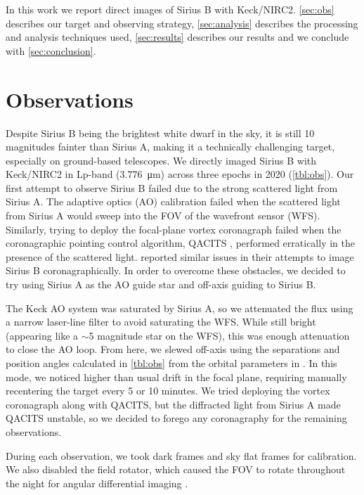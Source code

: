 \documentclass[twocolumn]{aastex631}
\begin{document}
In this work we report direct images of Sirius B with Keck/NIRC2. \autoref{sec:obs} describes our target and observing strategy, \autoref{sec:analysis} describes the processing and analysis techniques used, \autoref{sec:results} describes our results and we conclude with \autoref{sec:conclusion}.

\section{Observations} \label{sec:obs}

Despite Sirius B being the brightest white dwarf in the sky, it is still 10 magnitudes fainter than Sirius A, making it a technically challenging target, especially on ground-based telescopes. We directly imaged Sirius B with Keck/NIRC2 in Lp-band (\qty{3.776}{\micro\meter}) across three epochs in 2020 (\autoref{tbl:obs}). Our first attempt to observe Sirius B failed due to the strong scattered light from Sirius A. The adaptive optics (AO) calibration failed when the scattered light from Sirius A would sweep into the FOV of the wavefront sensor (WFS). Similarly, trying to deploy the focal-plane vortex coronagraph \citep{serabyn_w_2017} failed when the coronagraphic pointing control algorithm, QACITS \citep{huby_w_2017}, performed erratically in the presence of the scattered light. \citet[\S2]{vigan_high-contrast_2015} reported similar issues in their attempts to image Sirius B coronagraphically. In order to overcome these obstacles, we decided to try using Sirius A as the AO guide star and off-axis guiding to Sirius B.

The Keck AO system \citep{wizinowich_performance_2000} was saturated by Sirius A, so we attenuated the flux using a narrow laser-line filter to avoid saturating the WFS. While still bright (appearing like a $\sim$5 magnitude star on the WFS), this was enough attenuation to close the AO loop. From here, we slewed off-axis using the separations and position angles calculated in \autoref{tbl:obs} from the orbital parameters in \cite{bond_sirius_2017}. In this mode, we noticed higher than usual drift in the focal plane, requiring manually recentering the target every 5 or 10 minutes. We tried deploying the vortex coronagraph along with QACITS, but the diffracted light from Sirius A made QACITS unstable, so we decided to forego any coronagraphy for the remaining observations.

During each observation, we took dark frames and sky flat frames for calibration. We also disabled the field rotator, which caused the FOV to rotate throughout the night for angular differential imaging \citep[ADI;][]{marois_angular_2006}.
\end{document}
